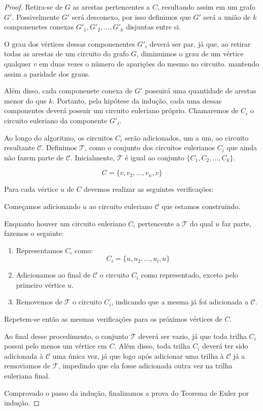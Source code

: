 \documentclass{article}
\begin{document}
\begin{proof}
Retira-se de $G$ as arestas pertencentes a $C$, resultando assim em um grafo $G'$. 
Possivelmente $G'$ será desconexo, por isso definimos que $G'$ será a união de $k$ componenetes conexas $G'_1, G'_2, \dots, G'_k$ disjuntas entre si.

O grau dos vértices dessas componenentes $G'_i$ deverá ser par, já que, ao retirar todas as arestas de um circuito do grafo $G$, diminuimos o grau de um vértice qualquer $v$ em duas vezes o número de aparições do mesmo no circuito. mantendo assim a paridade dos graus. 

Além disso, cada componenete conexa de $G'$ possuirá uma quantidade de arestas menor do que $k$.
Portanto, pela hipótese da indução, cada uma dessas componentes deverá possuir um circuito euleriano próprio. 
Chamaremos de $C_i$ o circuito euleriano da componente $G'_i$.

Ao longo do algoritmo, os circuitos $C_i$ serão adicionados, um a um, ao circuito resultante $\mathcal{C}$. 
Definimos $\mathcal{T}$, como o conjunto dos circuitos eulerianos $C_i$ que ainda não fazem parte de $\mathcal{C}$. 
Inicialmente, $\mathcal{T}$ é igual ao conjunto $\{C_1, C_2, \dots, C_k\}$.


\[
	C = \{v, v_2, \dots, v_n, v\}
\]

Para cada vértice $u$ de $C$ devemos realizar as seguintes verificações:

\begin{tcolorbox}

Começamos adicionando $u$ ao circuito euleriano $\mathcal{C}$ que estamos construindo.

Enquanto houver um circuito euleriano $C_i$ pertencente a $\mathcal{T}$ do qual $u$ faz parte, fazemos o seguinte:


\begin{enumerate}
    \item Representamos $C_i$ como: 
    \[
        C_i = \{u, u_2, \dots, u_l, u\}
    \]

\item Adicionamos ao final de $\mathcal{C}$ o circuito $C_i$ como representado, exceto pelo primeiro vértice $u$. 

\item Removemos de $\mathcal{T}$ o circuito $C_i$, indicando que a mesma já foi adicionada a $\mathcal{C}$.

\end{enumerate}

Repetem-se então as mesmas verificações para os próximos vértices de $C$.
\end{tcolorbox}


Ao final desse procedimento, o conjunto $\mathcal{T}$ deverá ser vazio, já que toda trilha $C_i$ possui pelo menos um vértice em $C$. Além disso, toda trilha $C_i$ deverá ter sido adicionada à $\mathcal{C}$ uma única vez, já que logo após adicionar uma trilha à $\mathcal{C}$ já a removiamos de $\mathcal{T}$, impedindo que ela fosse adicionada outra vez na trilha euleriana final.

Comprovado o passo da indução, finalizamos a prova do Teorema de Euler por indução.

\end{proof}
\end{document}
